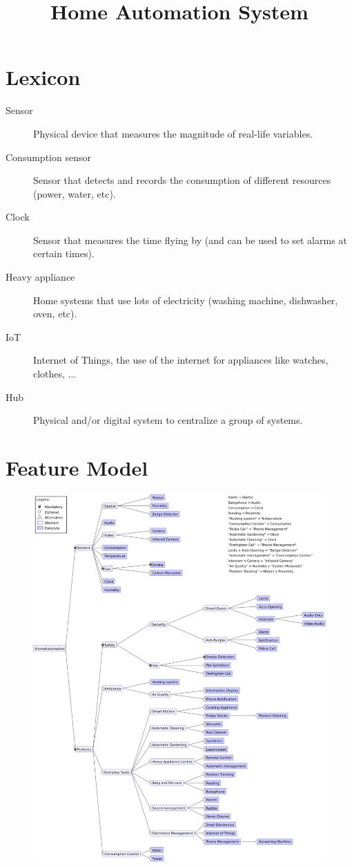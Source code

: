     \title{Home Automation System}
    \newpage

    \section{Lexicon}
        \begin{description}
            \item[Sensor] Physical device that measures the magnitude of real-life variables.
            \item[Consumption sensor] Sensor that detects and records the consumption of different resources (power, water, etc).
            \item[Clock] Sensor that measures the time flying by (and can be used to set alarms at certain times).
            \item[Heavy appliance] Home systems that use lots of electricity (washing machine, dishwasher, oven, etc).
            \item[IoT] Internet of Things, the use of the internet for appliances like watches, clothes, ...
            \item[Hub] Physical and/or digital system to centralize a group of systems.
        \end{description}
    \section{Feature Model}
        \begin{figure}[H]
            \includegraphics[width=\textwidth]{FeatureModel.png}
        \end{figure}


